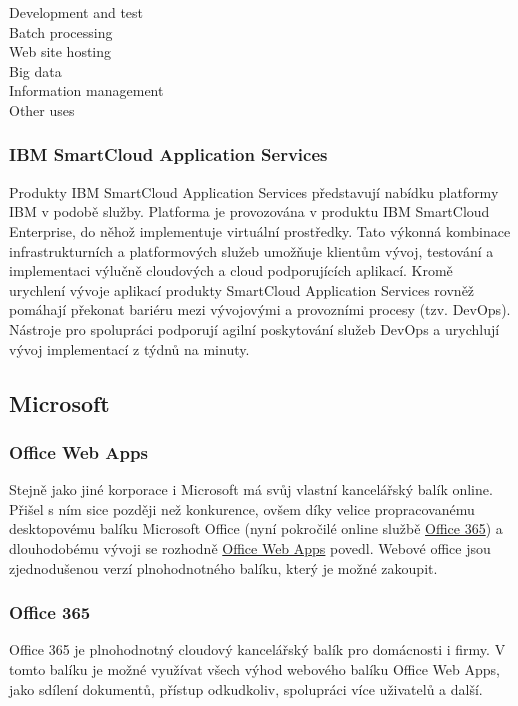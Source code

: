 \begin{description}
	\item[Development and test]
	\item[Batch processing]
	\item[Web site hosting]
	\item[Big data]
	\item[Information management]
	\item[Other uses]
\end{description}

\subsubsection{IBM SmartCloud Application Services}
Produkty IBM SmartCloud Application Services představují nabídku platformy IBM v podobě služby. Platforma je provozována v produktu IBM SmartCloud Enterprise, do něhož implementuje virtuální prostředky. Tato výkonná kombinace infrastrukturních a platformových služeb umožňuje klientům vývoj, testování a implementaci výlučně cloudových a cloud podporujících aplikací. Kromě urychlení vývoje aplikací produkty SmartCloud Application Services rovněž pomáhají překonat bariéru mezi vývojovými a provozními procesy (tzv. DevOps). Nástroje pro spolupráci podporují agilní poskytování služeb DevOps a urychlují vývoj implementací z týdnů na minuty.\cite{ibm:smartCloudEnt}

\subsection{Microsoft}
\subsubsection{Office Web Apps}
Stejně jako jiné korporace i Microsoft má svůj vlastní kancelářský balík online. Přišel s ním sice později než konkurence, ovšem díky velice propracovanému desktopovému balíku Microsoft Office (nyní pokročilé online službě \href{https://office.microsoft.com}{Office 365}) a dlouhodobému vývoji se rozhodně \href{https://skydrive.live.com}{Office Web Apps} povedl. Webové office jsou zjednodušenou verzí plnohodnotného balíku, který je možné zakoupit.

\subsubsection{Office 365}
Office 365 je plnohodnotný cloudový kancelářský balík pro domácnosti i firmy. V tomto balíku je možné využívat všech výhod webového balíku Office Web Apps, jako sdílení dokumentů, přístup odkudkoliv, spolupráci více uživatelů a další. 

